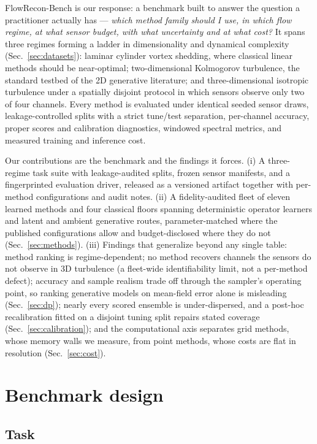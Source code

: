 \documentclass[aip,pof,reprint,amsmath,amssymb,superscriptaddress]{revtex4-1}
\newcommand{\benchname}{FlowRecon-Bench}
\begin{document}
\benchname{} is our response: a benchmark built to answer the question a
practitioner actually has --- \emph{which method family should I use, in which
flow regime, at what sensor budget, with what uncertainty and at what cost?}
It spans three regimes forming a ladder in dimensionality and dynamical
complexity (Sec.~\ref{sec:datasets}): laminar cylinder vortex shedding, where
classical linear methods should be near-optimal; two-dimensional Kolmogorov
turbulence, the standard testbed of the 2D generative
literature;\cite{shu2023physics,li2024s3gm} and three-dimensional isotropic
turbulence under a spatially disjoint protocol in which sensors observe only
two of four channels. Every method is evaluated under identical seeded sensor
draws, leakage-controlled splits with a strict tune/test separation,
per-channel accuracy, proper scores and calibration diagnostics, windowed
spectral metrics, and measured training and inference cost.

Our contributions are the benchmark and the findings it forces. (i) A
three-regime task suite with leakage-audited splits, frozen sensor manifests,
and a fingerprinted evaluation driver, released as a versioned artifact
together with per-method configurations and audit notes. (ii) A
fidelity-audited fleet of eleven learned methods and four classical floors
spanning deterministic operator learners and latent and ambient generative
routes, parameter-matched where the published configurations allow and
budget-disclosed where they do not (Sec.~\ref{sec:methods}). (iii) Findings
that generalize beyond any single table: method ranking is regime-dependent;
no method recovers channels the sensors do not observe in 3D turbulence
(a fleet-wide identifiability limit, not a per-method defect); accuracy and
sample realism trade off through the sampler's operating point, so ranking
generative models on mean-field error alone is misleading
(Sec.~\ref{sec:dp}); nearly every scored ensemble is under-dispersed, and a post-hoc
recalibration fitted on a disjoint tuning split repairs stated coverage
(Sec.~\ref{sec:calibration}); and the computational axis separates grid
methods, whose memory walls we measure, from point methods, whose costs are
flat in resolution (Sec.~\ref{sec:cost}).

\section{Benchmark design}\label{sec:design}

\subsection{Task}\label{sec:task}
\end{document}
